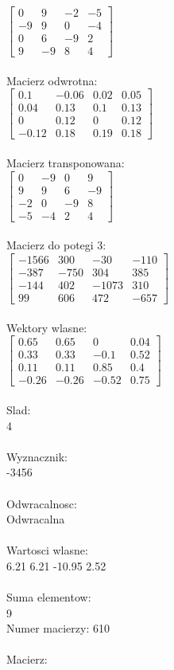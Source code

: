 \documentclass[a4paper,12pt]{article}
\begin{document}
$\begin{bmatrix} 0&9&-2&-5\\-9&9&0&-4\\0&6&-9&2\\9&-9&8&4 \end{bmatrix}$
\\
\\
Macierz odwrotna:\\

$\begin{bmatrix} 0.1&-0.06&0.02&0.05\\0.04&0.13&0.1&0.13\\0&0.12&0&0.12\\-0.12&0.18&0.19&0.18 \end{bmatrix}$
\\
\\
Macierz transponowana:\\

$\begin{bmatrix} 0&-9&0&9\\9&9&6&-9\\-2&0&-9&8\\-5&-4&2&4 \end{bmatrix}$
\\
\\
Macierz do potegi 3:\\

$\begin{bmatrix} -1566&300&-30&-110\\-387&-750&304&385\\-144&402&-1073&310\\99&606&472&-657 \end{bmatrix}$
\\
\\
Wektory wlasne:\\

$\begin{bmatrix} 0.65&0.65&0&0.04\\0.33&0.33&-0.1&0.52\\0.11&0.11&0.85&0.4\\-0.26&-0.26&-0.52&0.75 \end{bmatrix}$
\\
\\
Slad:\\
4
\\
\\
Wyznacznik:\\
-3456
\\
\\
Odwracalnosc:\\
Odwracalna
\\
\\
Wartosci wlasne:\\
6.21 6.21 -10.95 2.52
\\
\\
Suma elementow:\\
9
\\
\newpage
Numer macierzy:
610
\\
\\
Macierz:\\
\end{document}
